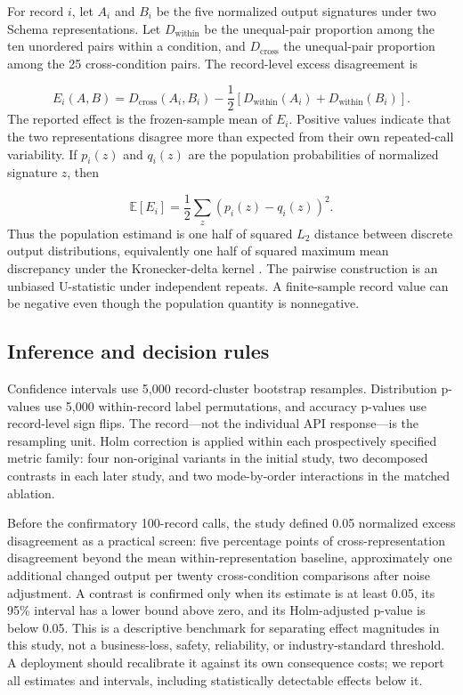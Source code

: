 \documentclass[11pt,a4paper]{article}
\begin{document}
For record \(i\), let \(A_i\) and \(B_i\) be the five normalized output signatures under two Schema representations. Let \(D_{\mathrm{within}}\) be the unequal-pair proportion among the ten unordered pairs within a condition, and \(D_{\mathrm{cross}}\) the unequal-pair proportion among the 25 cross-condition pairs. The record-level excess disagreement is

\[
E_i(A,B)=D_{\mathrm{cross}}(A_i,B_i)-\frac{1}{2}\left[D_{\mathrm{within}}(A_i)+D_{\mathrm{within}}(B_i)\right].
\]
The reported effect is the frozen-sample mean of \(E_i\). Positive values indicate that the two representations disagree more than expected from their own repeated-call variability. If \(p_i(z)\) and \(q_i(z)\) are the population probabilities of normalized signature \(z\), then

\[
\mathbb{E}[E_i]=\frac{1}{2}\sum_z\left(p_i(z)-q_i(z)\right)^2.
\]
Thus the population estimand is one half of squared \(L_2\) distance between discrete output distributions, equivalently one half of squared maximum mean discrepancy under the Kronecker-delta kernel \citep{gretton2012kernel}. The pairwise construction is an unbiased U-statistic under independent repeats. A finite-sample record value can be negative even though the population quantity is nonnegative.

\subsection{Inference and decision rules}
Confidence intervals use 5,000 record-cluster bootstrap resamples. Distribution p-values use 5,000 within-record label permutations, and accuracy p-values use record-level sign flips. The record---not the individual API response---is the resampling unit. Holm correction is applied within each prospectively specified metric family: four non-original variants in the initial study, two decomposed contrasts in each later study, and two mode-by-order interactions in the matched ablation.

Before the confirmatory 100-record calls, the study defined 0.05 normalized excess disagreement as a practical screen: five percentage points of cross-representation disagreement beyond the mean within-representation baseline, approximately one additional changed output per twenty cross-condition comparisons after noise adjustment. A contrast is confirmed only when its estimate is at least 0.05, its 95\% interval has a lower bound above zero, and its Holm-adjusted p-value is below 0.05. This is a descriptive benchmark for separating effect magnitudes in this study, not a business-loss, safety, reliability, or industry-standard threshold. A deployment should recalibrate it against its own consequence costs; we report all estimates and intervals, including statistically detectable effects below it.
\end{document}
